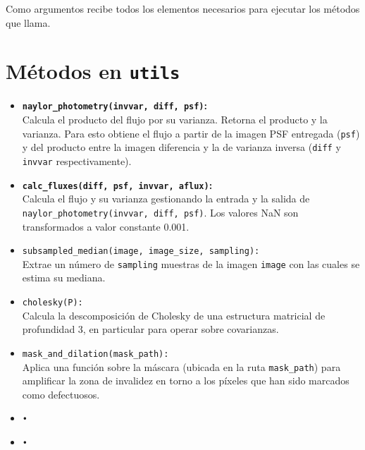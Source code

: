 \begin{appendix}
\begin{itemize}
Como argumentos recibe todos los elementos necesarios para ejecutar los m\'etodos que llama.

\end{itemize}
\pagebreak

\section{M\'etodos en \texttt{utils}}
\label{ap:utils}
\begin{itemize}
\item \textbf{\texttt{naylor\_photometry(invvar, diff, psf)}:}\\
Calcula el producto del flujo por su varianza. Retorna el producto y la varianza. Para esto obtiene el flujo a partir de la imagen PSF entregada (\texttt{psf}) y del producto entre la imagen diferencia y la de varianza inversa (\texttt{diff} y \texttt{invvar} respectivamente)\cite{naylor}.
\bigskip


\item \textbf{\texttt{calc\_fluxes(diff, psf, invvar, aflux)}:}\\
Calcula el flujo y su varianza gestionando la entrada y la salida de \texttt{naylor\_photometry(invvar, diff, psf)}. Los valores NaN son transformados a valor constante 0.001.
\bigskip

\item \texttt{subsampled\_median(image, image\_size, sampling):}\\
Extrae un n\'umero de \texttt{sampling} muestras de la imagen \texttt{image} con las cuales se estima su mediana. 
\bigskip

\item \texttt{cholesky(P):}\\
Calcula la descomposici\'on de Cholesky de una estructura matricial de profundidad 3, en particular para operar sobre covarianzas.
\bigskip

\item \texttt{mask\_and\_dilation(mask\_path):}\\
Aplica una funci\'on sobre la m\'ascara (ubicada en la ruta \texttt{mask\_path}) para amplificar la zona de invalidez en torno a los p\'ixeles que han sido marcados como defectuosos.
\bigskip

\item \texttt{•}\\
\bigskip

\item \texttt{•}\\


\end{itemize}
\end{appendix}
